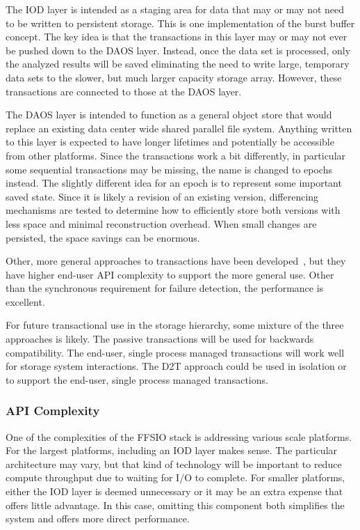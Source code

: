 The IOD layer is intended as a staging area for data that may or may not need
to be written to persistent storage. This is one implementation of the burst
buffer concept. The key idea is that the transactions in this layer may or may
not ever be pushed down to the DAOS layer. Instead, once the data set is
processed, only the analyzed results will be saved eliminating the need to
write large, temporary data sets to the slower, but much larger capacity
storage array. However, these transactions are connected to those at the DAOS
layer.

The DAOS layer is intended to function as a general object store that would
replace an existing data center wide shared parallel file system. Anything
written to this layer is expected to have longer lifetimes and potentially be
accessible from other platforms. Since the transactions work a bit differently,
in particular some sequential transactions may be missing, the name is changed
to epochs instead. The slightly different idea for an epoch is to represent
some important saved state. Since it is likely a revision of an existing
version, differencing mechanisms are tested to determine how to efficiently
store both versions with less space and minimal reconstruction overhead. When
small changes are persisted, the space savings can be enormous.

Other, more general approaches to transactions have been
developed~\cite{lofstead:2012:txn-cluster,lofstead:2014:txn-discs}, but they
have higher end-user API complexity to support the more general use. Other than
the synchronous requirement for failure detection, the performance is
excellent.

For future transactional use in the storage hierarchy, some mixture of the
three approaches is likely. The passive transactions will be used for backwards
compatibility. The end-user, single process managed transactions will work well
for storage system interactions. The D2T approach could be used in isolation or
to support the end-user, single process managed transactions.

\subsubsection{API Complexity}
One of the complexities of the FFSIO stack is addressing various scale
platforms. For the largest platforms, including an IOD layer makes sense. The
particular architecture may vary, but that kind of technology will be important
to reduce compute throughput due to waiting for I/O to complete. For smaller
platforms, either the IOD layer is deemed unnecessary or it may be an extra
expense that offers little advantage. In this case, omitting this component
both simplifies the system and offers more direct performance.

